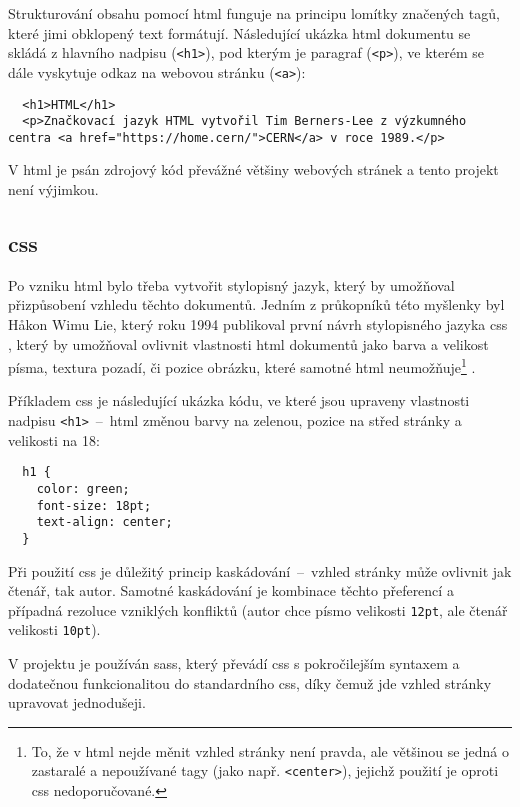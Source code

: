 \documentclass[a4paper, 12pt]{article}
\begin{document}
  Strukturování obsahu pomocí \gls{html} funguje na principu lomítky značených tagů, které jimi obklopený text formátují. Následující ukázka \gls{html} dokumentu se skládá z hlavního nadpisu (\texttt{<h1>}), pod kterým je paragraf (\texttt{<p>}), ve kterém se dále vyskytuje odkaz na webovou stránku (\texttt{<a>}):

  \begin{verbatim}
  <h1>HTML</h1>
  <p>Značkovací jazyk HTML vytvořil Tim Berners-Lee z výzkumného centra <a href="https://home.cern/">CERN</a> v roce 1989.</p>
  \end{verbatim}

  V \gls{html} je psán zdrojový kód převážné většiny webových stránek a tento projekt není výjimkou.


  \subsection{\acrshort{css}} \label{sec:CSS}
  Po vzniku \gls{html} bylo třeba vytvořit stylopisný jazyk, který by umožňoval přizpůsobení vzhledu těchto dokumentů. Jedním z průkopníků této myšlenky byl Håkon Wimu Lie, který roku 1994 publikoval první návrh stylopisného jazyka \gls{css} \cite{css-proposal}, který by umožňoval ovlivnit vlastnosti \gls{html} dokumentů jako barva a velikost písma, textura pozadí, či pozice obrázku, které samotné \gls{html} neumožňuje\footnote{To, že v \gls{html} nejde měnit vzhled stránky není pravda, ale většinou se jedná o zastaralé a nepoužívané tagy (jako např. \texttt{<center>}), jejichž použití je oproti \gls{css} nedoporučované.} \cite{css-saga}.

  Příkladem \gls{css} je následující ukázka kódu, ve které jsou upraveny vlastnosti nadpisu \texttt{<h1>}~--~\gls{html} změnou barvy na zelenou, pozice na střed stránky a velikosti na 18:

  \begin{verbatim}
  h1 {
    color: green;
    font-size: 18pt;
    text-align: center;
  }
  \end{verbatim}

  Při použití \gls{css} je důležitý princip kaskádování~--~vzhled stránky může ovlivnit jak čtenář, tak autor. Samotné kaskádování je kombinace těchto přeferencí a případná rezoluce vzniklých konfliktů (autor chce písmo velikosti \texttt{12pt}, ale čtenář velikosti \texttt{10pt}).

  V projektu je používán \gls{sass}, který převádí \gls{css} s pokročilejším syntaxem a dodatečnou funkcionalitou do standardního \gls{css}, díky čemuž jde vzhled stránky upravovat jednodušeji.
\end{document}
